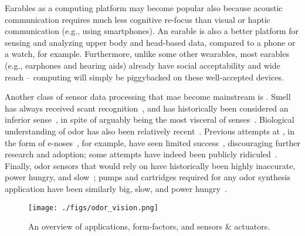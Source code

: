 Earables as a computing platform may become popular also because acoustic
communication requires much less cognitive re-focus than visual or haptic
communication (e.g., using smartphones)\cite{rethink}. An earable is also a
better platform for sensing and analyzing upper body and head-based data,
compared to a phone or a watch, for example. Furthermore, unlike some other
wearables, most earables (e.g., earphones and hearing aids) already have social
acceptability and wide reach -- computing will simply be piggybacked on
these well-accepted devices.

Another class of sensor data processing that 
mae become 
mainstream is {\em \olfc{}}.  Smell has always received scant
recognition~\cite{rouby2002olfaction}, and has historically been considered an
inferior sense~\cite{rouby2002olfaction}, in spite of arguably being the most
visceral of senses~\cite{stewart_2022}. Biological understanding of odor has
also been relatively recent~\cite{nobelprize.org_2004}. Previous attempts at \olfc{}, in
the form of e-noses~\cite{karakaya2020electronic}, for example, have seen
limited success~\cite{smith_kiger_2006, platt_1999}, discouraging further
research and adoption; some attempts have indeed been publicly
ridiculed~\cite{smith_kiger_2006}. Finally, odor sensors that \olfc{} would
rely on have historically been highly inaccurate, power hungry, and
slow~\cite{wilson2016recent}; pumps and cartridges required for any odor
synthesis~\cite{olorama_technology, aromajoin_corporation, tillotson2006scent,
amores2017essence, anthrotronix_2019} application have been similarly big,
slow, and power hungry~\cite{mielle2022cold, solis2005fluctuation, maritex}.

\begin{wrapfigure}{r}{0.5\textwidth}
    \centering
    \texttt{[image: ./figs/odor\_vision.png]}
    \caption{\small
        An overview of \olfc{} applications,
        form-factors, and sensors \& actuators.
    }
    \label{fig:vision}
\end{wrapfigure}

